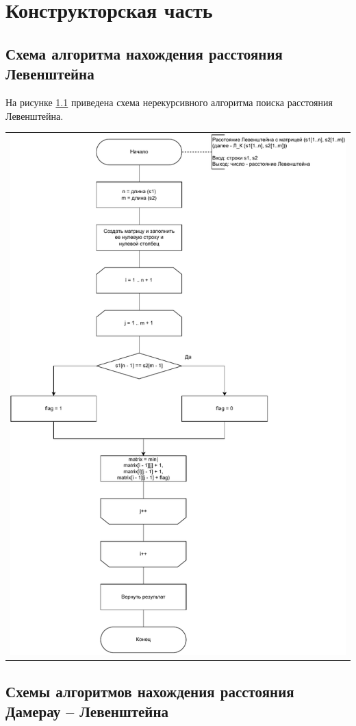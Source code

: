 \chapter{Конструкторская часть}

\section{Схема алгоритма нахождения расстояния Левенштейна}

На рисунке \ref{img:levenstein} приведена схема нерекурсивного алгоритма поиска расстояния Левенштейна.

\begin{table}[h!]
	\centering
	\begin{tabular}{p{1\linewidth}}
		\centering
		\includegraphics[width=0.8\linewidth]{include/lev.pdf}
		\captionof{figure}{Схема нерекурсивного алгоритма поиска расстояния Левенштейна}
		\label{img:levenstein}
	\end{tabular}
\end{table}

\section{Схемы алгоритмов нахождения расстояния Дамерау -- Левенштейна}

